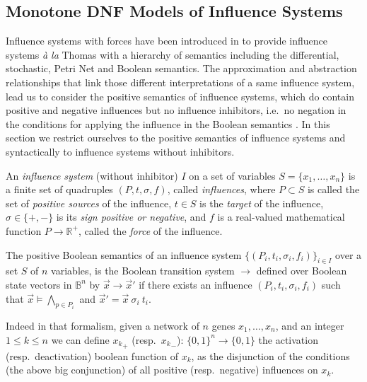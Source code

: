 \documentclass{llncs}
\newcommand{\lra}{\longrightarrow}
\begin{document}
\subsection{Monotone DNF Models of Influence Systems}

Influence systems with forces have been introduced in \cite{FMRS16cmsb} 
to provide influence systems \emph{\`a la} Thomas with a hierarchy of semantics
including the differential, stochastic, Petri Net and Boolean semantics.
The approximation and abstraction relationships that link those different interpretations of a same influence system,
lead us to consider the positive semantics of influence systems,
which do contain positive and negative influences but no influence inhibitors, i.e.~no negation in the conditions
for applying the influence in the Boolean semantics \cite{FMRS16cmsb}.
In this section we restrict ourselves to the positive semantics of influence systems
and syntactically to influence systems without inhibitors.

\begin{definition}

   An \emph{influence system} (without inhibitor) $I$ on a set of variables $S=\{x_1,\dots,x_n\}$ is a
   finite set of quadruples $(P, t, \sigma, f)$, called \emph{influences}, where
   $P\subset S$ is called the set of \emph{positive sources} of the influence,
$t\in S$ is the \emph{target} of the influence,
   $\sigma\in\{+,-\}$ is its \emph{sign positive or negative}, and $f$ is a
   real-valued mathematical function $P\to\mathbb{R^+}$, called the
   \emph{force} of the influence.

\end{definition}

\begin{definition}
The positive Boolean semantics of an influence system $\{(P_i, t_i, \sigma_i, f_i)\}_{i\in I}$
over a set $S$ of $n$ variables,
is the Boolean transition system $\lra$ defined over Boolean state vectors in $\mathbb{B}^n$
by
${\vec x}\lra{\vec x'}$ if there exists an influence $(P_i, t_i, \sigma_i, f_i)$
such that ${\vec x}\models \bigwedge_{p\in P_i}$
and ${\vec x'} = {\vec x}\ \sigma_i\ t_i$.
\end{definition}

  Indeed in that formalism, given a network of $n$ genes $x_1,\ldots,x_n$, and
  an integer $1 \leq k \leq n$ we can define ${x_k}_+$ (resp.\ ${x_k}_-$):
  ${\{0,1\}}^n \rightarrow\{0,1\}$ the activation (resp.\ deactivation)
  boolean function of $x_k$, as the disjunction of the conditions (the above
  big conjunction) of all positive (resp.\ negative) influences on $x_k$.
\end{document}
